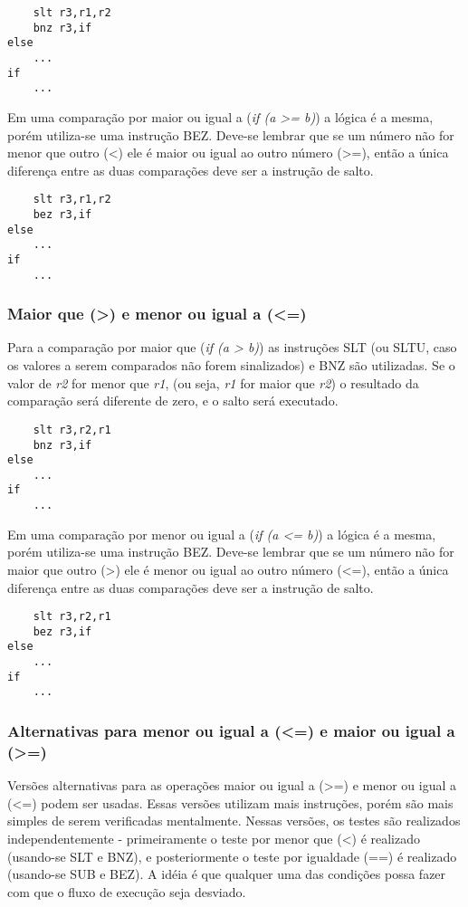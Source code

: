 \documentclass{extreport}
\begin{document}
\begin{verbatim}
    slt r3,r1,r2
    bnz r3,if
else
    ...
if
    ...
\end{verbatim}

Em uma comparação por maior ou igual a (\textit{if (a >= b)}) a lógica é a mesma, porém utiliza-se uma instrução BEZ. Deve-se lembrar que se um número não for menor que outro (<) ele é maior ou igual ao outro número (>=), então a única diferença entre as duas comparações deve ser a instrução de salto.

\begin{verbatim}
    slt r3,r1,r2
    bez r3,if
else
    ...
if
    ...
\end{verbatim}

\subsubsection{Maior que (>) e menor ou igual a (<=)}

Para a comparação por maior que (\textit{if (a > b)}) as instruções SLT (ou SLTU, caso os valores a serem comparados não forem sinalizados) e BNZ são utilizadas. Se o valor de \textit{r2} for menor que \textit{r1}, (ou seja, \textit{r1} for maior que \textit{r2}) o resultado da comparação será diferente de zero, e o salto será executado.

\begin{verbatim}
    slt r3,r2,r1
    bnz r3,if
else
    ...
if
    ...
\end{verbatim}

Em uma comparação por menor ou igual a (\textit{if (a <= b)}) a lógica é a mesma, porém utiliza-se uma instrução BEZ. Deve-se lembrar que se um número não for maior que outro (>) ele é menor ou igual ao outro número (<=), então a única diferença entre as duas comparações deve ser a instrução de salto.

\begin{verbatim}
    slt r3,r2,r1
    bez r3,if
else
    ...
if
    ...
\end{verbatim}

\subsubsection{Alternativas para menor ou igual a (<=) e maior ou igual a (>=)}

Versões alternativas para as operações maior ou igual a (>=) e menor ou igual a (<=) podem ser usadas. Essas versões utilizam mais instruções, porém são mais simples de serem verificadas mentalmente. Nessas versões, os testes são realizados independentemente - primeiramente o teste por menor que (<) é realizado (usando-se SLT e BNZ), e posteriormente o teste por igualdade (==) é realizado (usando-se SUB e BEZ). A idéia é que qualquer uma das condições possa fazer com que o fluxo de execução seja desviado.
\end{document}
